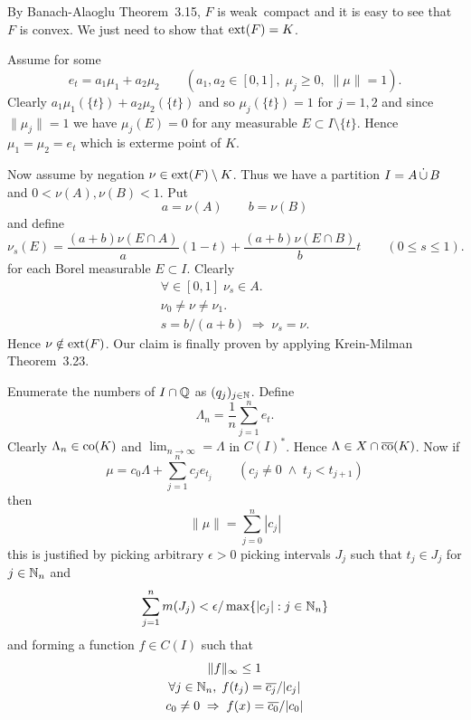 \begin{enumerate}
\begin{itemize}
By Banach-Alaoglu
Theorem~3.15, $F$ is weak\upstar\ compact and it is easy to see
that $F$ is convex. We just need to show that \(\mathop{\rm ext}\nolimits(F) = K\).

Assume for some 
\begin{equation*}
e_t = a_1\mu_1 + a_2 \mu_2 \qquad
  (a_1,a_2 \in [0,1],\; \mu_j \geq 0,\; \|\mu\| = 1).
\end{equation*}
Clearly \(a_1 \mu_1(\{t\}) + a_2 \mu_2(\{t\})\)
and so \(\mu_j(\{t\}) = 1\) for \(j=1,2\) and since \(\|\mu_j\| = 1\)
we have \(\mu_j(E) = 0\) for any measurable \(E \subset I \setminus \{t\}\).
Hence \(\mu_1 = \mu_2 = e_t\) which is exterme point of $K$.

Now assume by negation \(\nu \in \mathop{\rm ext}\nolimits(F) \setminus K\).
Thus we have a partition \(I = A \disjunion B\) and \(0 < \nu(A), \nu(B) < 1\).
Put
\begin{equation*}
a = \nu(A) \qquad b = \nu(B)
\end{equation*}
and define
\begin{equation*}
\nu_s(E) 
=   \frac{(a+b)\nu(E \cap A)}{a}(1 - t)
  + \frac{(a+b)\nu(E \cap B)}{b}t  \qquad ( 0 \leq s \leq 1).
\end{equation*}
for each Borel measurable \(E\subset I\). Clearly
\begin{gather*}
\forall\in[0,1]\; \nu_s \in A. \\
\nu_0 \neq \nu \neq \nu_1.\\
s = b/(a+b) \;\Rightarrow\; \nu_s = \nu.
\end{gather*}
Hence \(\nu \notin \mathop{\rm ext}\nolimits(F)\).
Our claim is finally proven by applying Krein-Milman
Theorem~3.23.

Enumerate the numbers of \(I\cap \mathbb{Q}\) as \((q_j)_{j\in\mathbb{N}}\).
Define
\begin{equation*}
\Lambda_n = \frac{1}{n}\sum_{j=1}^n e_t.
\end{equation*}
Clearly \(\Lambda_n \in \mathop{\rm co}\nolimits(K)\) and 
\(\lim_{n\to\infty} = \Lambda\) in \(C(I)^*\).
Hence \(\Lambda \in X \cap \overline{\mathop{\rm co}\nolimits}(K)\).
Now if
\begin{equation*}
\mu = c_0\Lambda + \sum_{j=1}^n c_j e_{t_j} \qquad
  (c_j \neq 0\;\wedge\; t_j < t_{j+1})
\end{equation*}
then
\begin{equation*}
\|\mu\| = \sum_{j=0}^n |c_j|
\end{equation*}
this is justified by picking arbitrary \(\epsilon>0\) 
picking intervals \(J_j\) such that \(t_j\in J_j\) for \(j\in\mathbb{N}_n\)
and 
\begin{equation*}
\sum_{j=1}^n m(J_j) < \epsilon/\max\{|c_j|:j\in\mathbb{N}_n\}
\end{equation*}
and forming a function 
\(f\in C(I)\) such that 
\begin{gather*}
\|f\|_\infty \leq 1 \\
\forall j\in\mathbb{N}_n,\; f(t_j) = \overline{c_j}/|c_j| \\
c_0 \neq 0 \;\Rightarrow\; f(x) = \overline{c_0}/|c_0|
\end{gather*}


\end{itemize}
\end{enumerate}
